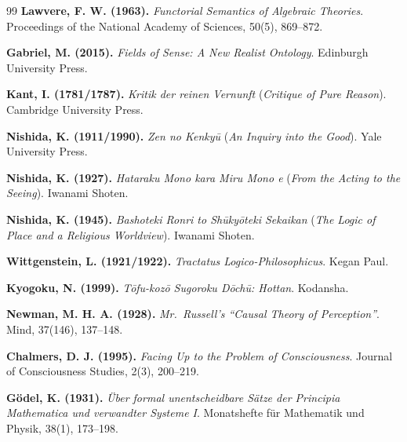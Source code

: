 \documentclass[11pt,a4paper]{article}
\theoremstyle{definition}
\theoremstyle{plain}
\begin{document}
\begin{thebibliography}{99}
\textbf{Lawvere, F. W. (1963).} \textit{Functorial Semantics of Algebraic Theories}. Proceedings of the National Academy of Sciences, 50(5), 869--872.

\textbf{Gabriel, M. (2015).} \textit{Fields of Sense: A New Realist Ontology}. Edinburgh University Press.

\textbf{Kant, I. (1781/1787).} \textit{Kritik der reinen Vernunft} (\textit{Critique of Pure Reason}). Cambridge University Press.

\textbf{Nishida, K. (1911/1990).} \textit{Zen no Kenky\=u} (\textit{An Inquiry into the Good}). Yale University Press.

\textbf{Nishida, K. (1927).} \textit{Hataraku Mono kara Miru Mono e} (\textit{From the Acting to the Seeing}). Iwanami Shoten.

\textbf{Nishida, K. (1945).} \textit{Bashoteki Ronri to Sh\=uky\=oteki Sekaikan} (\textit{The Logic of Place and a Religious Worldview}). Iwanami Shoten.

\textbf{Wittgenstein, L. (1921/1922).} \textit{Tractatus Logico-Philosophicus}. Kegan Paul.

\textbf{Kyogoku, N. (1999).} \textit{T\=ofu-koz\=o Sugoroku D\=och\=u: Hottan}. Kodansha.

\textbf{Newman, M. H. A. (1928).} \textit{Mr.\ Russell's ``Causal Theory of Perception''}. Mind, 37(146), 137--148.

\textbf{Chalmers, D. J. (1995).} \textit{Facing Up to the Problem of Consciousness}. Journal of Consciousness Studies, 2(3), 200--219.

\textbf{G\"odel, K. (1931).} \textit{\"Uber formal unentscheidbare S\"atze der Principia Mathematica und verwandter Systeme I}. Monatshefte f\"ur Mathematik und Physik, 38(1), 173--198.

\end{thebibliography}
\end{document}
